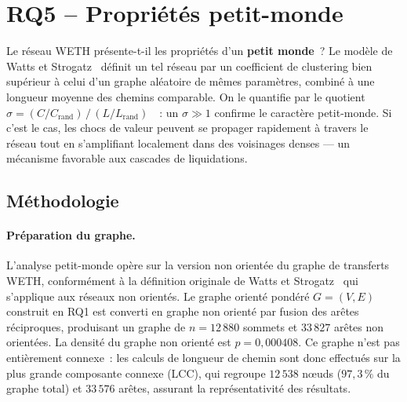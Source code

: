 
\section{RQ5 -- Propri\'et\'es petit-monde}
\label{sec:rq5}

Le r\'eseau WETH pr\'esente-t-il les propri\'et\'es d'un \textbf{petit monde}~? Le mod\`ele de Watts et Strogatz~\cite{watts1998smallworld} d\'efinit un tel r\'eseau par un coefficient de clustering bien sup\'erieur \`a celui d'un graphe al\'eatoire de m\^emes param\`etres, combin\'e \`a une longueur moyenne des chemins comparable. On le quantifie par le quotient $\sigma = (C / C_{\text{rand}}) \,/\, (L / L_{\text{rand}})$~\cite{humphries2008smallworld}~: un $\sigma \gg 1$ confirme le caract\`ere petit-monde. Si c'est le cas, les chocs de valeur peuvent se propager rapidement \`a travers le r\'eseau tout en s'amplifiant localement dans des voisinages denses --- un m\'ecanisme favorable aux cascades de liquidations.

\subsection{M\'ethodologie}
\label{sec:rq5_methodo}

\paragraph{Pr\'eparation du graphe.}
L'analyse petit-monde op\`ere sur la version non orient\'ee du graphe de transferts WETH, conform\'ement \`a la d\'efinition originale de Watts et Strogatz~\cite{watts1998smallworld} qui s'applique aux r\'eseaux non orient\'es. Le graphe orient\'e pond\'er\'e $G = (V, E)$ construit en RQ1 est converti en graphe non orient\'e par fusion des ar\^etes r\'eciproques, produisant un graphe de $n = 12\,880$ sommets et $33\,827$ ar\^etes non orient\'ees. La densit\'e du graphe non orient\'e est $p = 0{,}000408$. Ce graphe n'est pas enti\`erement connexe~: les calculs de longueur de chemin sont donc effectu\'es sur la plus grande composante connexe (LCC), qui regroupe $12\,538$ n\oe{}uds ($97{,}3\,\%$ du graphe total) et $33\,576$ ar\^etes, assurant la repr\'esentativit\'e des r\'esultats.

